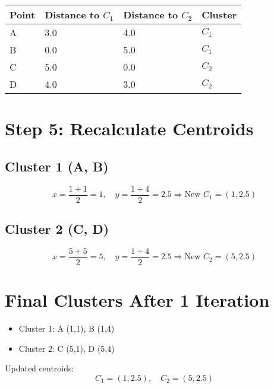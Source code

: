 \documentclass{article}
\begin{document}
\begin{center}
\begin{tabular}{llll}
\toprule
Point & Distance to \( C_1 \) & Distance to \( C_2 \) & Cluster \\
\midrule
A & 3.0 & 4.0 & \( C_1 \) \\
B & 0.0 & 5.0 & \( C_1 \) \\
C & 5.0 & 0.0 & \( C_2 \) \\
D & 4.0 & 3.0 & \( C_2 \) \\
\bottomrule
\end{tabular}
\end{center}

\section*{Step 5: Recalculate Centroids}

\subsection*{Cluster 1 (A, B)}
\[
x = \frac{1 + 1}{2} = 1, \quad y = \frac{1 + 4}{2} = 2.5 \Rightarrow \text{New } C_1 = (1, 2.5)
\]

\subsection*{Cluster 2 (C, D)}
\[
x = \frac{5 + 5}{2} = 5, \quad y = \frac{1 + 4}{2} = 2.5 \Rightarrow \text{New } C_2 = (5, 2.5)
\]

\section*{Final Clusters After 1 Iteration}

\begin{itemize}
    \item Cluster 1: A (1,1), B (1,4)
    \item Cluster 2: C (5,1), D (5,4)
\end{itemize}

Updated centroids:
\[
C_1 = (1, 2.5), \quad C_2 = (5, 2.5)
\]
\end{document}
